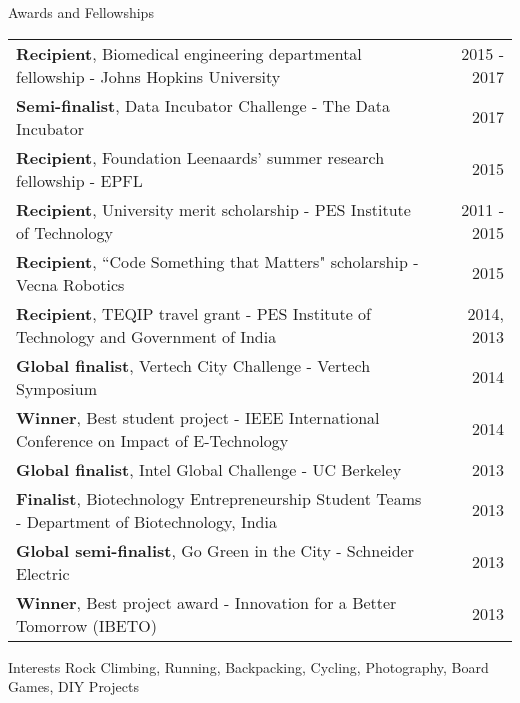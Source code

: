 \documentclass{resume}
\begin{document}
        \begin{rSection}{Awards and Fellowships}
\begin{tabular*}{\textwidth}{@{\extracolsep{\fill}}lr@{}}
\textbf{Recipient}, Biomedical engineering departmental fellowship - Johns Hopkins University & 2015 - 2017\\ 
\textbf{Semi-finalist}, Data Incubator Challenge - The Data Incubator & 2017\\
\textbf{Recipient}, Foundation Leenaards' summer research fellowship - EPFL &  2015\\
\textbf{Recipient}, University merit scholarship - PES Institute of Technology & 2011 - 2015 \\ 
\textbf{Recipient}, ``Code Something that Matters" scholarship - Vecna Robotics & 2015\\
\textbf{Recipient}, TEQIP travel grant - PES Institute of Technology and Government of India& 2014, 2013 \\ 
\textbf{Global finalist}, Vertech City Challenge - Vertech Symposium  & 2014\\
\textbf{Winner}, Best student project - IEEE International Conference on Impact of E-Technology & 2014\\
\textbf{Global finalist}, Intel Global Challenge -  UC Berkeley & 2013 \\
\textbf{Finalist}, Biotechnology Entrepreneurship Student Teams - Department of Biotechnology, India & 2013\\
\textbf{Global semi-finalist}, Go Green in the City - Schneider Electric & 2013 \\
\textbf{Winner}, Best project award - Innovation for a Better Tomorrow (IBETO)  & 2013
\end{tabular*}
    \end{rSection}

\begin{rSection}{Interests}
Rock Climbing, Running, Backpacking, Cycling, Photography, Board Games, DIY Projects
\end{rSection} 



\end{document}
